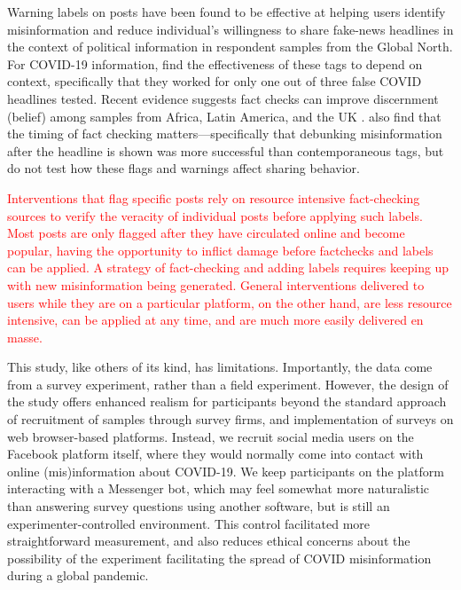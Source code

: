 \documentclass[letterpaper, 12pt, parskip=full,DIV=10]{scrartcl}
\begin{document}
Warning labels on posts have been found to be effective at helping users identify misinformation \citep{clayton2020real} and reduce individual's willingness to share fake-news headlines \citep{mena2020cleaning} in the context of political information in respondent samples from the Global North.  For COVID-19 information, \citet{kreps2020medical} find the effectiveness of these tags to depend on context, specifically that they worked for only one out of three false COVID headlines tested. Recent evidence suggests fact checks can improve discernment (belief) among samples from Africa, Latin America, and the UK \citep{porter2021global}. \citet{brashier2021timing} also find that the timing of fact checking matters---specifically that debunking misinformation after the headline is shown was more successful than contemporaneous tags, but do not test how these flags and warnings affect sharing behavior. 


\textcolor{red}{ %
Interventions that flag specific posts rely on resource intensive fact-checking sources to verify the veracity of individual posts before applying such labels.  Most posts are only flagged after they have circulated online and become popular, having the opportunity to inflict damage before factchecks and labels can be applied. A strategy of fact-checking and adding labels requires keeping up with new misinformation being generated. General interventions delivered to users while they are on a particular platform, on the other hand, are less resource intensive, can be applied at any time, and are much more easily delivered en masse. 
}


This study, like others of its kind, has limitations. Importantly, the data come from a survey experiment, rather than a field experiment. However, the design of the study offers enhanced realism for participants beyond the standard approach of recruitment of samples through survey firms, and implementation of surveys on web browser-based platforms. Instead, we recruit social media users on the Facebook platform itself, where they would normally come into contact with online (mis)information about COVID-19. We keep participants on the platform interacting with a Messenger bot, which may feel somewhat more naturalistic than answering survey questions using another software, but is still an experimenter-controlled environment. This control facilitated more straightforward measurement, and also reduces ethical concerns about the possibility of the experiment facilitating the spread of COVID misinformation during a global pandemic. 
\end{document}
